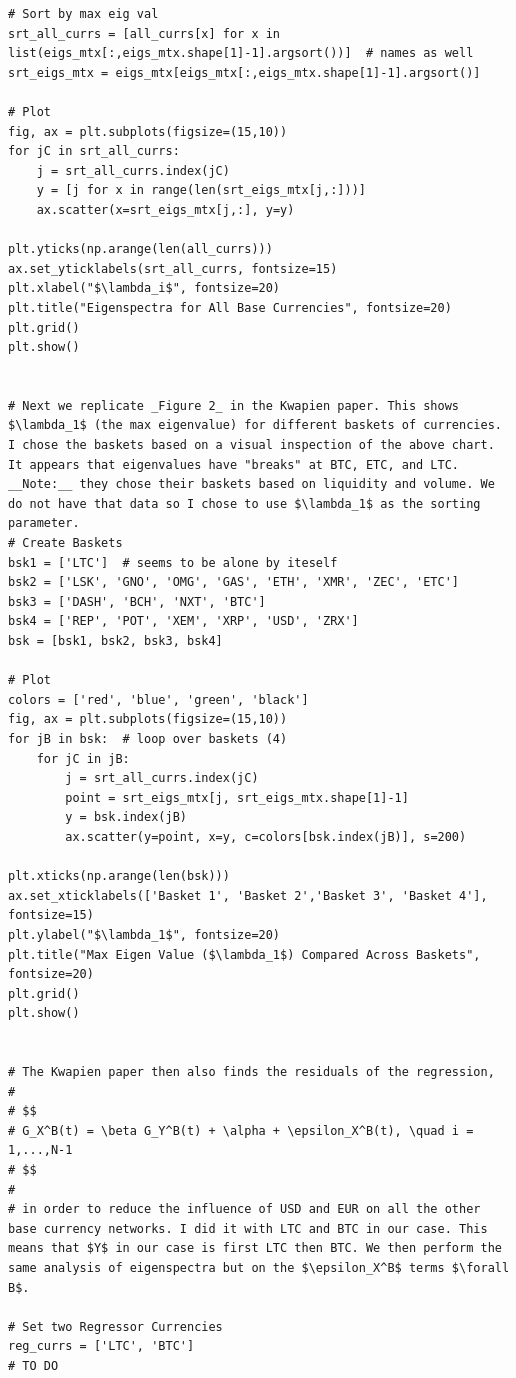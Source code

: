 \documentclass[a4paper]{article}
\begin{document}
\begin{lstlisting}
# Sort by max eig val
srt_all_currs = [all_currs[x] for x in list(eigs_mtx[:,eigs_mtx.shape[1]-1].argsort())]  # names as well
srt_eigs_mtx = eigs_mtx[eigs_mtx[:,eigs_mtx.shape[1]-1].argsort()]

# Plot
fig, ax = plt.subplots(figsize=(15,10))
for jC in srt_all_currs:
    j = srt_all_currs.index(jC)
    y = [j for x in range(len(srt_eigs_mtx[j,:]))]
    ax.scatter(x=srt_eigs_mtx[j,:], y=y)

plt.yticks(np.arange(len(all_currs)))
ax.set_yticklabels(srt_all_currs, fontsize=15)
plt.xlabel("$\lambda_i$", fontsize=20)
plt.title("Eigenspectra for All Base Currencies", fontsize=20)
plt.grid()
plt.show()


# Next we replicate _Figure 2_ in the Kwapien paper. This shows $\lambda_1$ (the max eigenvalue) for different baskets of currencies. I chose the baskets based on a visual inspection of the above chart. It appears that eigenvalues have "breaks" at BTC, ETC, and LTC. __Note:__ they chose their baskets based on liquidity and volume. We do not have that data so I chose to use $\lambda_1$ as the sorting parameter.
# Create Baskets
bsk1 = ['LTC']  # seems to be alone by iteself
bsk2 = ['LSK', 'GNO', 'OMG', 'GAS', 'ETH', 'XMR', 'ZEC', 'ETC']
bsk3 = ['DASH', 'BCH', 'NXT', 'BTC']
bsk4 = ['REP', 'POT', 'XEM', 'XRP', 'USD', 'ZRX']
bsk = [bsk1, bsk2, bsk3, bsk4]

# Plot
colors = ['red', 'blue', 'green', 'black']
fig, ax = plt.subplots(figsize=(15,10))
for jB in bsk:  # loop over baskets (4)
    for jC in jB:
        j = srt_all_currs.index(jC)
        point = srt_eigs_mtx[j, srt_eigs_mtx.shape[1]-1]
        y = bsk.index(jB)
        ax.scatter(y=point, x=y, c=colors[bsk.index(jB)], s=200)

plt.xticks(np.arange(len(bsk)))
ax.set_xticklabels(['Basket 1', 'Basket 2','Basket 3', 'Basket 4'], fontsize=15)
plt.ylabel("$\lambda_1$", fontsize=20)
plt.title("Max Eigen Value ($\lambda_1$) Compared Across Baskets", fontsize=20)
plt.grid()
plt.show()


# The Kwapien paper then also finds the residuals of the regression,
# 
# $$
# G_X^B(t) = \beta G_Y^B(t) + \alpha + \epsilon_X^B(t), \quad i = 1,...,N-1
# $$
# 
# in order to reduce the influence of USD and EUR on all the other base currency networks. I did it with LTC and BTC in our case. This means that $Y$ in our case is first LTC then BTC. We then perform the same analysis of eigenspectra but on the $\epsilon_X^B$ terms $\forall B$.

# Set two Regressor Currencies
reg_currs = ['LTC', 'BTC']
# TO DO



\end{lstlisting}
\end{document}
